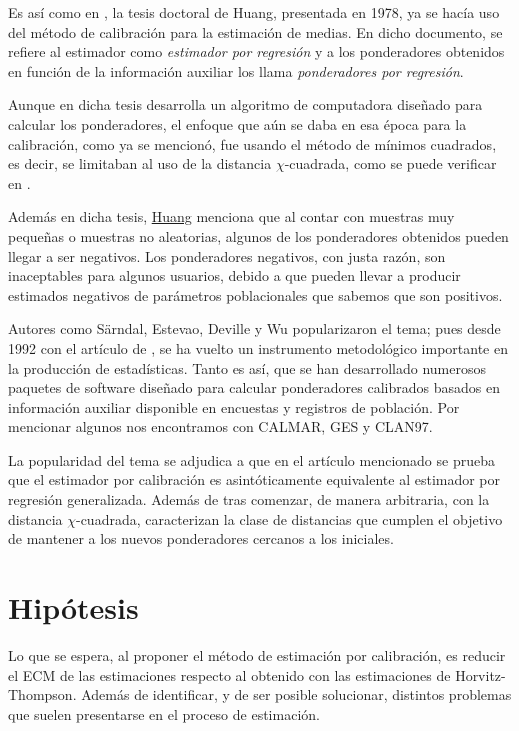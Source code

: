 \documentclass[a4paper,twoside,openright,12pt]{book}
\theoremstyle{definition}
\newcommand{\citeOne}[1]{\hyperlink{bib}{#1}}
\numberwithin{equation}{chapter}
\numberwithin{figure}{chapter}
\numberwithin{table}{chapter}
\numberwithin{theorem}{chapter}
\numberwithin{lemma}{chapter}
\begin{document}
Es así como en \cite{CIS-549814}, la tesis doctoral de Huang, presentada en 1978, ya se hacía uso del método de calibración para la estimación de medias. En dicho documento, se refiere al estimador como \textsl{estimador por regresión} y a los ponderadores obtenidos en función de la información auxiliar los llama \textsl{ponderadores por regresión}.

Aunque en dicha tesis desarrolla un algoritmo de computadora diseñado para calcular los ponderadores, el enfoque que aún se daba en esa época para la calibración, como ya se mencionó, fue usando el método de mínimos cuadrados, es decir, se limitaban al uso de la distancia $\chi$-cuadrada, como se puede verificar en \citet[sección IV.A]{CIS-549814}.

Además en dicha tesis, \citeOne{Huang} menciona que al contar con muestras muy pequeñas o muestras no aleatorias, algunos de los ponderadores obtenidos pueden llegar a ser negativos. Los ponderadores negativos, con justa razón, son inaceptables para algunos usuarios, debido a que pueden llevar a producir estimados negativos de parámetros poblacionales que sabemos que son positivos.

Autores como Särndal, Estevao, Deville y Wu popularizaron el tema; pues desde 1992 con el artículo de \cite{CIS-106196}, se ha vuelto un instrumento metodológico importante en la producción de estadísticas. Tanto es así, que se han desarrollado numerosos paquetes de software diseñado para calcular ponderadores calibrados basados en información auxiliar disponible en encuestas y registros de población. Por mencionar algunos nos encontramos con CALMAR, GES y CLAN97.

La popularidad del tema se adjudica a que en el artículo mencionado se prueba que el estimador por calibración es asintóticamente equivalente al estimador por regresión generalizada. Además de tras comenzar, de manera arbitraria, con la distancia $\chi$-cuadrada, caracterizan la clase de distancias que cumplen el objetivo de mantener a los nuevos ponderadores cercanos a los iniciales.
\section*{Hipótesis}
Lo que se espera, al proponer el método de estimación por calibración, es reducir el ECM de las estimaciones respecto al obtenido con las estimaciones de Horvitz-Thompson. Además de identificar, y de ser posible solucionar, distintos problemas que suelen presentarse en el proceso de estimación.
\end{document}
